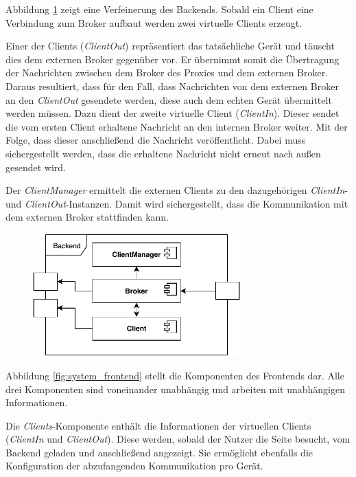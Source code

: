     Abbildung \ref{fig:system_backend} zeigt eine Verfeinerung des Backends. Sobald ein Client eine Verbindung zum Broker aufbaut werden zwei virtuelle Clients erzeugt.
    
    Einer der Clients (\emph{ClientOut}) repräsentiert das tatsächliche Gerät und täuscht dies dem externen Broker gegenüber vor. Er übernimmt somit die Übertragung der Nachrichten zwischen dem Broker des Proxies und dem externen Broker. Daraus resultiert, dass für den Fall, dass Nachrichten von dem externen Broker an den \emph{ClientOut} gesendete werden, diese auch dem echten Gerät übermittelt werden müssen. Dazu dient der zweite virtuelle Client (\emph{ClientIn}). Dieser sendet die vom ersten Client erhaltene Nachricht an den internen Broker weiter. Mit der Folge, dass dieser anschließend die Nachricht veröffentlicht. Dabei muss sichergestellt werden, dass die erhaltene Nachricht nicht erneut nach außen gesendet wird.
    
    Der \emph{ClientManager} ermittelt die externen Clients zu den dazugehörigen \emph{ClientIn}- und \emph{ClientOut}-Instanzen. Damit wird sichergestellt, dass die Kommunikation mit dem externen Broker stattfinden kann.
    \begin{figure}[h]%
        \centering
        \includegraphics[width=8cm]{tex/bilder/4_konzept/Systemdiagramm_Konzept_Backend.pdf}
        \label{fig:system_backend}
    \end{figure}
    
    Abbildung \ref{fig:system_frontend} stellt die Komponenten des Frontends dar. Alle drei Komponenten sind voneinander unabhängig und arbeiten mit unabhängigen Informationen.
    
    Die \emph{Clients}-Komponente enthält die Informationen der virtuellen Clients (\emph{ClientIn} und \emph{ClientOut}). Diese werden, sobald der Nutzer die Seite besucht, vom Backend geladen und anschließend angezeigt. Sie ermöglicht ebenfalls die Konfiguration der abzufangenden Kommunikation pro Gerät.
    
